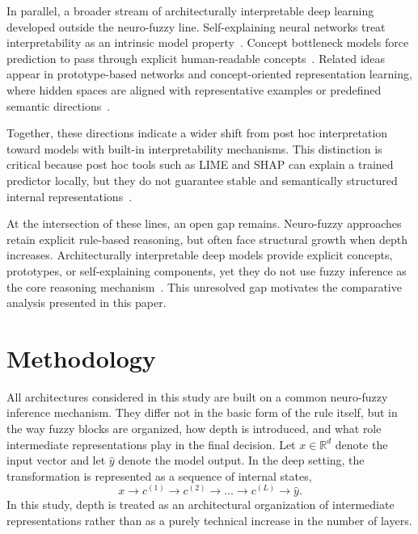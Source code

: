 \documentclass[runningheads]{llncs}
\begin{document}
In parallel, a broader stream of architecturally interpretable deep learning developed outside the neuro-fuzzy line. Self-explaining neural networks treat interpretability as an intrinsic model property~\cite{alvarez2018self}. Concept bottleneck models force prediction to pass through explicit human-readable concepts~\cite{koh2020concept}. Related ideas appear in prototype-based networks and concept-oriented representation learning, where hidden spaces are aligned with representative examples or predefined semantic directions~\cite{chen2019looks,chen2020concept}.

Together, these directions indicate a wider shift from post hoc interpretation toward models with built-in interpretability mechanisms. This distinction is critical because post hoc tools such as LIME and SHAP can explain a trained predictor locally, but they do not guarantee stable and semantically structured internal representations~\cite{ribeiro2016lime,lundberg2017shap,rudin2019stop}.

At the intersection of these lines, an open gap remains. Neuro-fuzzy approaches retain explicit rule-based reasoning, but often face structural growth when depth increases. Architecturally interpretable deep models provide explicit concepts, prototypes, or self-explaining components, yet they do not use fuzzy inference as the core reasoning mechanism~\cite{zeng2019deep,alvarez2018self,koh2020concept,chen2019looks,chen2020concept}. This unresolved gap motivates the comparative analysis presented in this paper.

\section{Methodology}

All architectures considered in this study are built on a common neuro-fuzzy inference mechanism. They differ not in the basic form of the rule itself, but in the way fuzzy blocks are organized, how depth is introduced, and what role intermediate representations play in the final decision. Let $x \in \mathbb{R}^d$ denote the input vector and let $\hat{y}$ denote the model output. In the deep setting, the transformation is represented as a sequence of internal states,
\[
x \rightarrow c^{(1)} \rightarrow c^{(2)} \rightarrow \dots \rightarrow c^{(L)} \rightarrow \hat{y}.
\]
In this study, depth is treated as an architectural organization of intermediate representations rather than as a purely technical increase in the number of layers.
\end{document}
